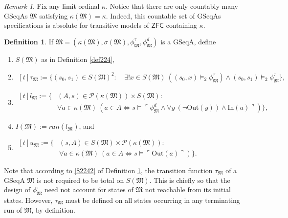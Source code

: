 \documentclass[12pt, twoside]{memoir}
\numberwithin{equation}{section}
\theoremstyle{definition}
\newtheorem{defi}[thm]{Definition}
\theoremstyle{remark}
\newtheorem{rem}[thm]{Remark}
\theoremstyle{definition}
\theoremstyle{definition}
\theoremstyle{definition}
\theoremstyle{remark}
\begin{document}
\begin{rem}\label{rem225}
Fix any limit ordinal $\kappa$. Notice that there are only countably many GSeqAs $\mathfrak{M}$ satisfying $\kappa(\mathfrak{M}) = \kappa$. Indeed, this countable set of GSeqAs specifications is absolute for transitive models of $\mathsf{ZFC}$ containing $\kappa$.
\end{rem}

\begin{defi}\label{8224}
If $\mathfrak{M} = (\kappa(\mathfrak{M}), \sigma(\mathfrak{M}), \phi^{\tau}_{\mathfrak{M}}, \phi^d_{\mathfrak{M}})$ is a GSeqA, define 
\begin{enumerate}[label=(\arabic*)]
    \item $S(\mathfrak{M})$ as in Definition \ref{def224},
    \item\label{82242} 
    \!
    $\begin{aligned}[t]
       \tau_{\mathfrak{M}} := \{(s_0, s_1) \in S(\mathfrak{M})^2 : \ & \exists ! x \in S(\mathfrak{M}) \ ((s_0, x) \models_2 \phi^{\tau}_{\mathfrak{M}}) \wedge (s_0, s_1) \models_2 \phi^{\tau}_{\mathfrak{M}}\} \text{,}
    \end{aligned}$
    \item 
    \!
    $\begin{aligned}[t]
       l_{\mathfrak{M}} := \{ & (A, s) \in \mathcal{P}(\kappa(\mathfrak{M})) \times S(\mathfrak{M}) : \\
       & \forall a \in \kappa(\mathfrak{M}) \ (a \in A \iff s \models \ulcorner \phi^d_{\mathfrak{M}} \wedge \forall y \ (\neg \mathrm{Out}(y)) \wedge \mathrm{In}(a) \urcorner)\} \text{,}
    \end{aligned}$
    \item $I(\mathfrak{M}) := ran(l_{\mathfrak{M}})$, and
    \item 
    \!
    $\begin{aligned}[t]
        u_{\mathfrak{M}} := \{ & (s, A) \in S(\mathfrak{M}) \times \mathcal{P}(\kappa(\mathfrak{M})) : \\
        & \forall a \in \kappa(\mathfrak{M}) \ (a \in A \iff s \models \ulcorner \mathrm{Out}(a) \urcorner)\} \text{.}
    \end{aligned}$
\end{enumerate}
\end{defi}

Note that according to \ref{82242} of Definition \ref{8224}, the transition function $\tau_{\mathfrak{M}}$ of a GSeqA $\mathfrak{M}$ is not required to be total on $S(\mathfrak{M})$. This is chiefly so that the design of $\phi^{\tau}_{\mathfrak{M}}$ need not account for states of $\mathfrak{M}$ not reachable from its initial states. However, $\tau_{\mathfrak{M}}$ must be defined on all states occurring in any terminating run of $\mathfrak{M}$, by definition.
\end{document}
